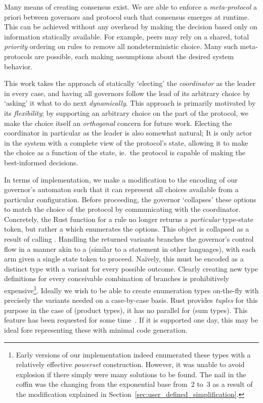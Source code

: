 Many means of creating consensus exist. We are able to enforce a \textit{meta-protocol} a priori between governors and protocol such that consensus emerges at runtime. This can be achieved without any overhead by making the decision based only on information statically available. For example, peers may rely on a shared, total \textit{priority} ordering on rules to remove all nondeterministic choice. Many such meta-protocols are possible, each making assumptions about the desired system behavior.

This work takes the approach of statically `electing' the \textit{coordinator} as the leader in every case, and having all governors follow the lead of its arbitrary choice by `asking' it what to do next \textit{dynamically}. This approach is primarily motivated by its \textit{flexibility}; by supporting an arbitrary choice on the part of the protocol, we make the choice itself an \textit{orthogonal} concern for future work. Electing the coordinator in particular as the leader is also somewhat natural; It is only actor in the system with a complete view of the protocol's state, allowing it to make the choice as a function of the state, ie.\ the protocol is capable of making the best-informed decisions.

In terms of implementation, we make a modification to the encoding of our governor's automaton such that it can represent all choices available from a particular configuration. Before proceeding, the governor `collapses' these options to match the choice of the protocol by communicating with the coordinator. Concretely, the Rust function for a rule no longer returns a \textit{particular} type-state token, but rather a  which enumerates the options. This object is collapsed as a result of calling . Handling the returned variants branches the governor's control flow in a manner akin to a  (similar to a  statement in other languages), with each arm given a single state token to proceed. Na\"ively, this must be encoded as a distinct  type with a variant for every possible outcome. Clearly creating new type definitions for every conceivable combination of branches is prohibitively expensive\footnote{Early versions of our implementation indeed enumerated these types with a relatively effective \textit{powerset} construction. However, it was unable to avoid explosion if there simply were many solutions to be found. The nail in the coffin was the changing from the exponential base from~2 to~3 as a result of the modification explained in Section~\ref{sec:user_defined_simplification}.}. Ideally we wish to be able to create enumeration types on-the-fly with precisely the variants needed on a case-by-case basis. Rust provides \textit{tuples} for this purpose in the case of  (product types), it has no parallel for  (sum types). This feature has been requested for some time~\cite{anon_sum}. If it is supported one day, this may be ideal fore representing these  with minimal code generation. 

